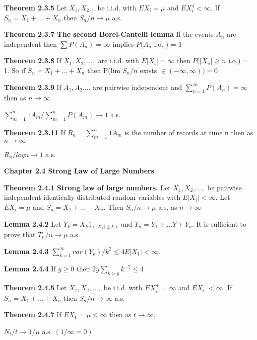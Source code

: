 \documentclass{article}
\newcommand\tab[1][1cm]{\hspace*{#1}}
\begin{document}
\textbf {Theorem 2.3.5} Let $X_1, X_2 ...$ be i.i.d. with $EX_i = \mu$ and $EX_i^4 < \infty$. If $S_n = X_1 + \dots + X_n$ then $S_n / n \rightarrow \mu$ a.s.

\textbf {Theorem 2.3.7 The second Borel-Cantelli lemma} If the events $A_n$ are independent then $\sum P(A_n) = \infty$ implies $P(A_n$ i.o. ) = 1

\textbf {Theorem 2.3.8} If $X_1 , X_2 ,...,$ are i.i.d. with $E|X_i| = \infty$ then $P(|X_n| \geq n$ i.o.) = 1. So if $S_n = X_1 + \dots + X_n$ then P(lim $S_n / n$ exists $\in (-\infty, \infty)) = 0$

\textbf {Theorem 2.3.9} If $A_1 , A_2 ....$ are pairwise independent and $\sum_{n=1}^\infty P(A_n) = \infty$ then as $n \rightarrow \infty$
\begin{center}
$\sum_{m=1}^n 1 A_m / \sum_{m=1}^n P(A_m) \rightarrow 1$ a.s.
\end{center}

\textbf {Theorem 2.3.11} If $R_n = \sum_{m=1}^n 1 A_m$ is the number of records at time n then as $n \rightarrow \infty$
\begin{center}
$R_n / log n \rightarrow 1$ a.s.
\end{center}

\textbf {Chapter 2.4 Strong Law of Large Numbers}

\textbf {Theorem 2.4.1 Strong law of large numbers.} Let $X_1 , X_2 ,...,$ be pairwise independent identically distributed random variables with $E|X_i| < \infty$. Let $EX_i = \mu$ and $S_n = X_1 + \dots + X_n$. Then $S_n / n \rightarrow \mu$ a.s. as $n \rightarrow \infty$

\textbf {Lemma 2.4.2} Let $Y_k = X_k 1_{(|X_k | \leq k)}$ and $T_n = Y_1 + \dots Y + Y_n$. It is sufficient to prove that $T_n / n \rightarrow \mu$ a.s.

\textbf {Lemma 2.4.3} $\sum_{k=1}^\infty var(Y_k) / k^2 \leq 4E|X_1| < \infty.$

\textbf {Lemma 2.4.4} If $y \geq 0$ then $2y\sum_{k>y} k^{-2} \leq 4$

\textbf {Theorem 2.4.5} Let $X_1 , X_2 ,...,$ be i.i.d. with $EX_i^+ = \infty$ and $EX_i^- < \infty.$ If $S_n = X_1 + \dots + X_n$ then $S_n / n \rightarrow \infty$ a.s.

\textbf {Theorem 2.4.7} If $EX_1 = \mu \leq \infty$ then as $t \rightarrow \infty$, 
\begin{center}
$N_t / t \rightarrow 1/\mu$ \tab a.s. $(1/\infty = 0)$
\end{center}
\end{document}
